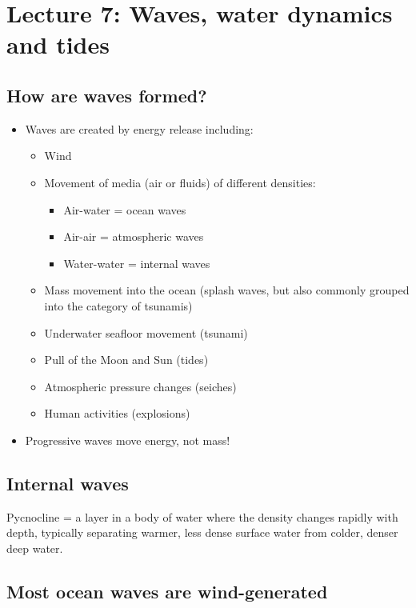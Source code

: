 \section{Lecture 7: Waves, water dynamics and tides}

\subsection{How are waves formed?}

\begin{itemize}
    \item Waves are created by energy release including:
    \begin{itemize}
        \item Wind
        \item Movement of media (air or fluids) of different densities:
        \begin{itemize}
            \item Air-water = ocean waves
            \item Air-air = atmospheric waves
            \item Water-water = internal waves
        \end{itemize}
        \item Mass movement into the ocean (splash waves, but also commonly grouped
            into the category of tsunamis)
        \item Underwater seafloor movement (tsunami)
        \item Pull of the Moon and Sun (tides)
        \item Atmospheric pressure changes (seiches)
        \item Human activities (explosions)
    \end{itemize}
    \item Progressive waves move energy, not mass!
\end{itemize}

\subsection{Internal waves}

Pycnocline = a layer in a body of water where the density changes rapidly with depth,
typically separating warmer, less dense surface water from colder, denser deep water.

\subsection{Most ocean waves are wind-generated}

